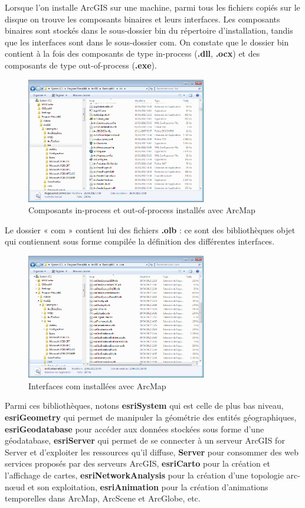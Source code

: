 \documentclass[11pt]{article}
\begin{document}
Lorsque l'on installe ArcGIS sur une machine, parmi tous les fichiers copiés sur le disque on trouve les composants binaires et leurs interfaces. Les composants binaires sont stockés dans le sous-dossier bin du répertoire d'installation, tandis que les interfaces sont dans le sous-dossier com.
On constate que le dossier bin contient à la fois des composants de type in-process (\textbf{.dll}, \textbf{.ocx}) et des composants de type out-of-process (\textbf{.exe}).

\begin{figure}[H]
	\center \includegraphics[width=0.70\textwidth]{img/cours/bin_arcgis.png}
	\caption{Composants in-process et out-of-process installés avec ArcMap}
\end{figure}

Le dossier « com » contient lui des fichiers \textbf{.olb} : ce sont des bibliothèques objet qui contiennent sous forme compilée la définition des différentes interfaces.

\begin{figure}[H]
	\center \includegraphics[width=0.70\textwidth]{img/cours/com_arcgis.png}
	\caption{Interfaces com installées avec ArcMap}
\end{figure}

Parmi ces bibliothèques, notons \textbf{esriSystem} qui est celle de plus bas niveau, \textbf{esriGeometry} qui permet de manipuler la géométrie des entités géographiques, \textbf{esriGeodatabase} pour accéder aux données stockées sous forme d'une géodatabase, \textbf{esriServer} qui permet de se connecter à un serveur ArcGIS for Server et d'exploiter les ressources qu'il diffuse, \textbf{Server} pour consommer des web services proposés par des serveurs ArcGIS, \textbf{esriCarto} pour la création et l'affichage de cartes, \textbf{esriNetworkAnalysis} pour la création d'une topologie arc-nœud et son exploitation, \textbf{esriAnimation} pour la création d'animations temporelles dans ArcMap, ArcScene et ArcGlobe, etc.
\end{document}
